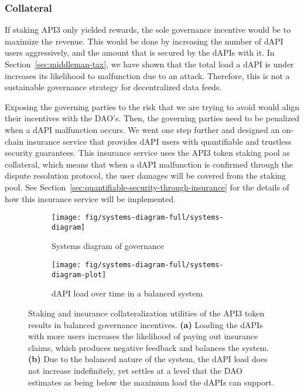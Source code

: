 \documentclass[11pt]{article}
\begin{document}
\subsubsection{Collateral}
\label{sec:collateral}

If staking API3 only yielded rewards, the sole governance incentive would be to maximize the revenue.
This would be done by increasing the number of dAPI users aggressively, and the amount that is secured by the dAPIs with it.
In Section~\ref{sec:middleman-tax}, we have shown that the total load a dAPI is under increases its likelihood to malfunction due to an attack.
Therefore, this is not a sustainable governance strategy for decentralized data feeds.

Exposing the governing parties to the risk that we are trying to avoid would align their incentives with the DAO’s.
Then, the governing parties need to be penalized when a dAPI malfunction occurs.
We went one step further and designed an on-chain insurance service that provides dAPI users with quantifiable and trustless security guarantees.
This insurance service uses the API3 token staking pool as collateral, which means that when a dAPI malfunction is confirmed through the dispute resolution protocol, the user damages will be covered from the staking pool.
See Section~\ref{sec:quantifiable-security-through-insurance} for the details of how this insurance service will be implemented.

\begin{figure}
     \centering
     \begin{subfigure}{0.49\textwidth}
         \texttt{[image: fig/systems-diagram-full/systems-diagram]}
         \caption{Systems diagram of governance}
         \label{fig:systems-diagram}
     \end{subfigure}
     \begin{subfigure}{0.49\textwidth}
         \texttt{[image: fig/systems-diagram-full/systems-diagram-plot]}
         \caption{dAPI load over time in a balanced system}
         \label{fig:systems-diagram-plot}
     \end{subfigure}
    \caption{Staking and insurance collateralization utilities of the API3 token results in balanced governance incentives.
    \textbf{(a)} Loading the dAPIs with more users increases the likelihood of paying out insurance claims, which produces negative feedback and balances the system.
   \textbf{(b)} Due to the balanced nature of the system, the dAPI load does not increase indefinitely, yet settles at a level that the DAO estimates as being below the maximum load the dAPIs can support.}
    \label{fig:systems-diagram-full}
\end{figure}
\end{document}

